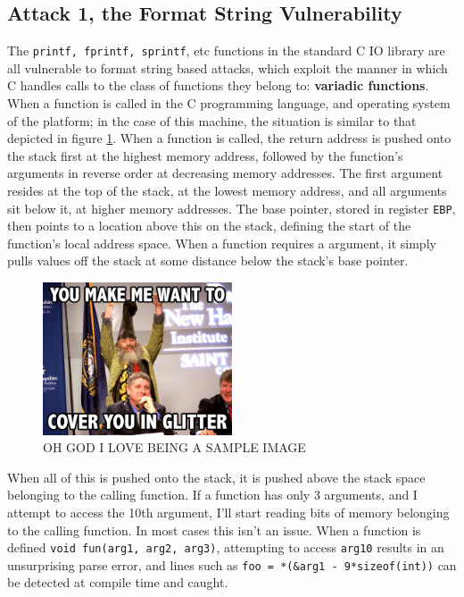 \subsection{Attack 1, the Format String Vulnerability}

The {\tt printf, fprintf, sprintf}, etc functions in the standard C IO library are all vulnerable to format string based
attacks, which exploit the manner in which C handles calls to the class of functions they belong to: \textbf{variadic
functions}\cite{vfunc}. When a function is called in the C programming language,
and operating system of the platform; in the case of this machine, the situation is similar to that depicted in figure
\ref{fig_stack}. When a function is called, the return address is pushed onto the stack first at the highest memory
address, followed by the function's arguments in reverse order at decreasing memory addresses. The first argument
resides at the top of the stack, at the lowest memory address, and all arguments sit below it, at higher memory
addresses. The base pointer, stored in register {\tt EBP}, then points to a location above this on the stack, defining
the start of the function's local address space. When a function requires a argument, it simply pulls values off the
stack at some distance below the stack's base pointer.

\begin{figure}[ht]     \centering     \includegraphics[width = 0.5\textwidth]{./images/placeholder.jpg}     \caption{OH
GOD I LOVE BEING A SAMPLE IMAGE}     \label{fig_stack} \end{figure}

When all of this is pushed onto the stack, it is pushed above the stack space belonging to the calling function. If a
function has only 3 arguments, and I attempt to access the 10th argument, I'll start reading bits of memory belonging to
the calling function. In most cases this isn't an issue. When a function is defined {\tt void fun(arg1, arg2, arg3)},
attempting to access {\tt arg10} results in an unsurprising parse error, and lines such as {\tt foo = *(\&arg1 -
9*sizeof(int))} can be detected at compile time and caught.

